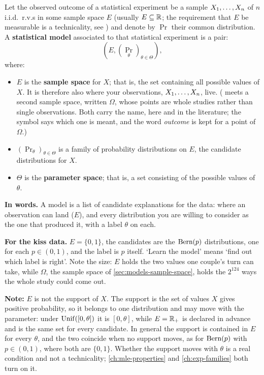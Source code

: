 \begin{definition}
\label{def:statmodel}
Let the observed outcome of a statistical experiment be a sample $X_1, \ldots, X_n$ of $n$ i.i.d.\ r.v.s in some sample space $E$ (usually $E \subseteq \mathbb{R}$; the requirement that $E$ be measurable is a technicality, see ) and denote by $\Pr$ their common distribution.
A \textbf{statistical model} associated to that statistical experiment is a pair:
\[
\left(E, (\Pr_\theta)_{\theta \in \Theta} \right),
\]
where:
\begin{itemize}[nosep]
\item $E$ is the \textbf{sample space} for $X$; that is, the set containing all possible values of $X$.
It is therefore also where your observations, $X_1, \ldots, X_n$, live.
( meets a second sample space, written $\Omega$, whose points are whole studies rather than single observations. Both carry the name, here and in the literature; the symbol says which one is meant, and the word \textit{outcome} is kept for a point of $\Omega$.)
\item $(\Pr_{\theta})_{\theta \in \Theta}$ is a family of probability distributions on $E$, the candidate distributions for $X$.
\item $\Theta$ is the \textbf{parameter space}; that is, a set consisting of the possible values of $\theta$.
\end{itemize}
\end{definition}

\begin{inwords}
\textbf{In words.} A model is a list of candidate explanations for the data: where an observation can land ($E$), and every distribution you are willing to consider as the one that produced it, with a label $\theta$ on each.
\par\smallskip
\textbf{For the kiss data.} $E = \{0, 1\}$, the candidates are the $\text{Bern}(p)$ distributions, one for each $p \in (0,1)$, and the label is $p$ itself. `Learn the model' means `find out which label is right'. Note the size: $E$ holds the two values one couple's turn can take, while $\Omega$, the sample space of \cref{sec:models-sample-space}, holds the $2^{124}$ ways the whole study could come out.
\end{inwords}

\textbf{Note:} $E$ is not the support of $X$. The support is the set of values $X$ gives positive probability, so it belongs to one distribution and may move with the parameter: under $\mathrm{Unif}([0,\theta])$ it is $[0,\theta]$, while $E = \mathbb{R}_+$ is declared in advance and is the same set for every candidate. In general the support is contained in $E$ for every $\theta$, and the two coincide when no support moves, as for $\text{Bern}(p)$ with $p \in (0,1)$, where both are $\{0,1\}$. Whether the support moves with $\theta$ is a real condition and not a technicality; \cref{ch:mle-properties} and \cref{ch:exp-families} both turn on it.

